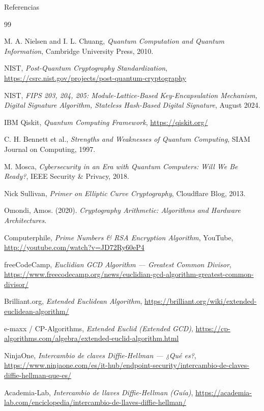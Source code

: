 \documentclass[aspectratio=169]{beamer}
\begin{document}
\begin{frame}[allowframebreaks]{Referencias}
\scriptsize
\raggedright

\begin{thebibliography}{99}

M. A. Nielsen and I. L. Chuang,
\textit{Quantum Computation and Quantum Information},
Cambridge University Press, 2010.

NIST,
\textit{Post-Quantum Cryptography Standardization},
\url{https://csrc.nist.gov/projects/post-quantum-cryptography}

NIST,
\textit{FIPS 203, 204, 205: Module-Lattice-Based Key-Encapsulation Mechanism, Digital Signature Algorithm, Stateless Hash-Based Digital Signature},
August 2024.

IBM Qiskit,
\textit{Quantum Computing Framework},
\url{https://qiskit.org/}

C. H. Bennett et al.,
\textit{Strengths and Weaknesses of Quantum Computing},
SIAM Journal on Computing, 1997.

M. Mosca,
\textit{Cybersecurity in an Era with Quantum Computers: Will We Be Ready?},
IEEE Security \& Privacy, 2018.

Nick Sullivan,
\textit{Primer on Elliptic Curve Cryptography},
Cloudflare Blog, 2013.


Omondi, Amos. (2020). \textit{Cryptography Arithmetic: Algorithms and Hardware Architectures}.

Computerphile, \textit{Prime Numbers \& RSA Encryption Algorithm}, YouTube, \url{http://youtube.com/watch?v=JD72Ry60eP4}

freeCodeCamp, \textit{Euclidian GCD Algorithm — Greatest Common Divisor}, \url{https://www.freecodecamp.org/news/euclidian-gcd-algorithm-greatest-common-divisor/}

Brilliant.org, \textit{Extended Euclidean Algorithm}, \url{https://brilliant.org/wiki/extended-euclidean-algorithm/}

e-maxx / CP-Algorithms, \textit{Extended Euclid (Extended GCD)}, \url{https://cp-algorithms.com/algebra/extended-euclid-algorithm.html}

NinjaOne, \textit{Intercambio de claves Diffie-Hellman — ¿Qué es?}, \url{https://www.ninjaone.com/es/it-hub/endpoint-security/intercambio-de-claves-diffie-hellman-que-es/}

Academia-Lab, \textit{Intercambio de llaves Diffie-Hellman (Guía)}, \url{https://academia-lab.com/enciclopedia/intercambio-de-llaves-diffie-hellman/}

\end{thebibliography}
\end{frame}
\end{document}
